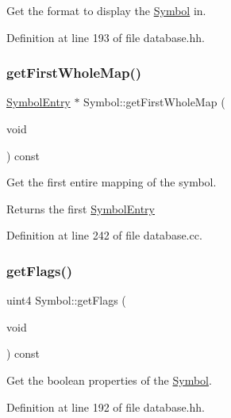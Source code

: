 Get the format to display the \mbox{\hyperlink{class_symbol}{Symbol}} in. 



Definition at line 193 of file database.\+hh.

\mbox{\label{class_symbol_a9176f3c0f44f3373ef092043486a147b}} 
\subsubsection{\texorpdfstring{getFirstWholeMap()}{getFirstWholeMap()}}
{\footnotesize\ttfamily \mbox{\hyperlink{class_symbol_entry}{Symbol\+Entry}} $\ast$ Symbol\+::get\+First\+Whole\+Map (\begin{DoxyParamCaption}\item[{void}]{ }\end{DoxyParamCaption}) const}



Get the first entire mapping of the symbol. 

\begin{DoxyReturn}{Returns}
the first \mbox{\hyperlink{class_symbol_entry}{Symbol\+Entry}} 
\end{DoxyReturn}


Definition at line 242 of file database.\+cc.

\mbox{\label{class_symbol_a89e604eeb814081ced6355fda04cc931}} 
\subsubsection{\texorpdfstring{getFlags()}{getFlags()}}
{\footnotesize\ttfamily uint4 Symbol\+::get\+Flags (\begin{DoxyParamCaption}\item[{void}]{ }\end{DoxyParamCaption}) const\hspace{0.3cm}{\ttfamily [inline]}}



Get the boolean properties of the \mbox{\hyperlink{class_symbol}{Symbol}}. 



Definition at line 192 of file database.\+hh.

\mbox{\label{class_symbol_a3bba6e7c23431123ff45f90d25617a3b}} 
